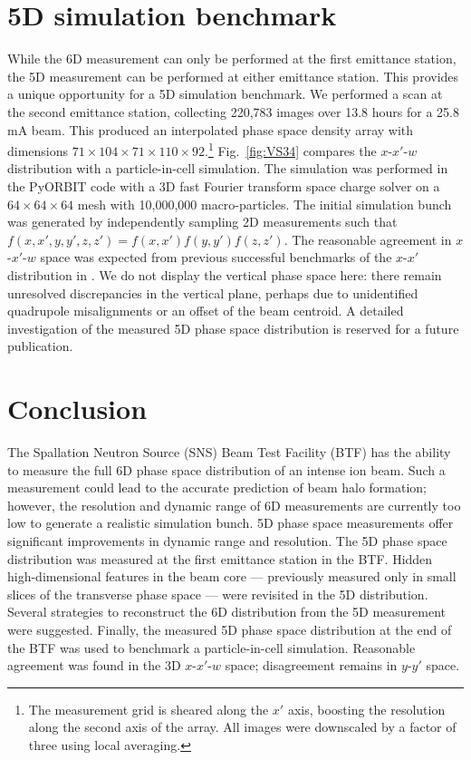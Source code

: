 \documentclass[letterpaper,
               keeplastbox,
               nospread,
               biblatex,
              ]{jacow}
\begin{document}
\section{5D simulation benchmark}

While the 6D measurement can only be performed at the first emittance station, the 5D measurement can be performed at either emittance station. This provides a unique opportunity for a 5D simulation benchmark. We performed a scan at the second emittance station, collecting 220,783 images over 13.8 hours for a 25.8 mA beam. This produced an interpolated phase space density array with dimensions $71 \times 104 \times 71 \times 110 \times 92$.\footnote{
    The measurement grid is sheared along the $x'$ axis, boosting the resolution along the second axis of the array. All images were downscaled by a factor of three using local averaging.
} Fig.~\ref{fig:VS34} compares the $x$-$x'$-$w$ distribution with a particle-in-cell simulation. The simulation was performed in the PyORBIT code with a 3D fast Fourier transform space charge solver on a $64\times 64 \times 64$ mesh with 10,000,000 macro-particles. The initial simulation bunch was generated by independently sampling 2D measurements such that $f(x,x',y,y',z,z') = f(x,x')f(y,y')f(z,z')$. The reasonable agreement in $x$-$x'$-$w$ space was expected from previous successful benchmarks of the $x$-$x'$ distribution in \cite{Ruisard2021-IPAC}. We do not display the vertical phase space here: there remain unresolved discrepancies in the vertical plane, perhaps due to unidentified quadrupole misalignments or an offset of the beam centroid. A detailed investigation of the measured 5D phase space distribution is reserved for a future publication.



\section{Conclusion}

The Spallation Neutron Source (SNS) Beam Test Facility (BTF) has the ability to measure the full 6D phase space distribution of an intense ion beam. Such a measurement could lead to the accurate prediction of beam halo formation; however, the resolution and dynamic range of 6D measurements are currently too low to generate a realistic simulation bunch. 5D phase space measurements offer significant improvements in dynamic range and resolution. The 5D phase space distribution was measured at the first emittance station in the BTF. Hidden high-dimensional features in the beam core — previously measured only in small slices of the transverse phase space — were revisited in the 5D distribution. Several strategies to reconstruct the 6D distribution from the 5D measurement were suggested. Finally, the measured 5D phase space distribution at the end of the BTF was used to benchmark a particle-in-cell simulation. Reasonable agreement was found in the 3D $x$-$x'$-$w$ space; disagreement remains in $y$-$y'$ space. 
\end{document}
